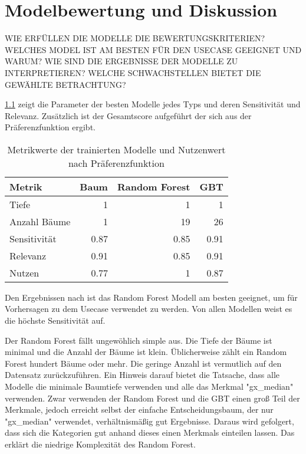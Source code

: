 \chapter{Modelbewertung und Diskussion}
\label{ch:modelbewertung}
WIE ERFÜLLEN DIE MODELLE DIE BEWERTUNGSKRITERIEN? WELCHES MODEL IST AM BESTEN FÜR DEN USECASE GEEIGNET UND WARUM? WIE SIND DIE ERGEBNISSE DER MODELLE ZU INTERPRETIEREN? WELCHE SCHWACHSTELLEN BIETET DIE GEWÄHLTE BETRACHTUNG?

\cref{tab:metrikwerte_der_trainierten_modelle} zeigt die Parameter der besten Modelle jedes Typs und deren Sensitivität und Relevanz. Zusätzlich ist der Gesamtscore aufgeführt der sich aus der Präferenzfunktion ergibt.

\begin{table}[ht]
	\raggedright
	\begin{tabularx}{\textwidth}{ | l | r | r | r|}
		\hline
		\rowcolor{gray!50}
		Metrik & Baum & Random Forest & GBT\\
		\hline
		Tiefe & 1 & 1 & 1\\
		Anzahl Bäume & 1 & 19 & 26\\
		Sensitivität & \num{0.87} & \num{0.85} & \num{0.91}\\
		Relevanz & \num{0.91} & \num{0.85} & \num{0.91}\\
		\hline
		\hline
		Nutzen & \num{0.77} & \num{1} & \num{0.87}\\
		\hline
	\end{tabularx}
	\caption{Metrikwerte der trainierten Modelle und Nutzenwert nach Präferenzfunktion}%
	\label{tab:metrikwerte_der_trainierten_modelle}	%
\end{table}


Den Ergebnissen nach ist das Random Forest Modell am besten geeignet, um für Vorhersagen zu dem Usecase verwendet zu werden. Von allen Modellen weist es die höchste Sensitivität auf. 

Der Random Forest fällt ungewöhlich simple aus. Die Tiefe der Bäume ist minimal und die Anzahl der Bäume ist klein. Üblicherweise zählt ein Random Forest hundert Bäume oder mehr. Die geringe Anzahl ist vermutlich auf den Datensatz zurückzuführen. Ein Hinweis darauf bietet die Tatsache, dass alle Modelle die minimale Baumtiefe verwenden und alle das Merkmal "gx\_median" verwenden. Zwar verwenden der Random Forest und die GBT einen groß Teil der Merkmale, jedoch erreicht selbst der einfache Entscheidungsbaum, der nur "gx\_median" verwendet, verhältnismäßig gut Ergebnisse. Daraus wird gefolgert, dass sich die Kategorien gut anhand dieses einen Merkmals einteilen lassen. Das erklärt die niedrige Komplexität des Random Forest.

